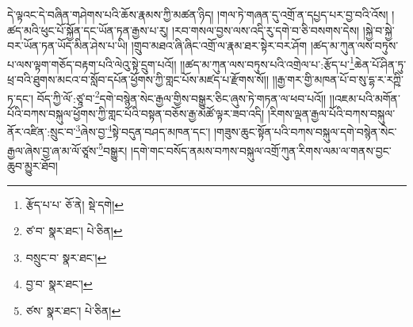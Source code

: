 དེ་ལྟའང་དེ་བཞིན་གཤེགས་པའི་ཆོས་རྣམས་ཀྱི་མཚན་ཉིད། །གལ་ཏེ་གཞན་དུ་འགྲོ་ན་དཔྱད་པར་བྱ་བའི་འོས། །ཚད་མའི་ཕུང་པོ་སྐྱོན་དང་ཡོན་ཏན་རྒྱས་པ་རུ། །རབ་གསལ་བྱས་ལས་འདི་རུ་དགེ་བ་ཅི་བསགས་དེས། །སྐྱེ་བ་སྐྱེ་བར་ཡོན་ཏན་ཡོད་མིན་ཤེས་པ་ཡི། །གྲུབ་མཐའ་ཞི་ཞིང་འགྲོ་ལ་རྣམ་ཐར་སྟེར་བར་ཤོག །ཚད་མ་ཀུན་ལས་བཏུས་པ་ལས་ལྟག་གཅོད་བརྟག་པའི་ལེའུ་སྟེ་དྲུག་པའོ།། །།ཚད་མ་ཀུན་ལས་བཏུས་པའི་འགྲེལ་པ་:རྩོད་པ་\footnote{རྩོད་པ་པ་  ཅོ་ནེ།  སྡེ་དགེ། }ཆེན་པོ་ཤིན་ཏུ་ཕྲ་བའི་ཐུགས་མངའ་བ་སློབ་དཔོན་ཕྱོགས་ཀྱི་གླང་པོས་མཛད་པ་རྫོགས་སོ།། །།རྒྱ་གར་གྱི་མཁན་པོ་བ་སུ་དྷ་ར་རཀྵི་ཏ་དང་། བོད་ཀྱི་ལོ་:ཙཱ་བ་\footnote{ཙ་བ་  སྣར་ཐང་།  པེ་ཅིན། }དགེ་བསྙེན་སེང་རྒྱལ་གྱིས་བསྒྱུར་ཅིང་ཞུས་ཏེ་གཏན་ལ་ཕབ་པའོ།། །།འཇམ་པའི་མགོན་པོའི་བཀས་བསྐུལ་ཕྱོགས་ཀྱི་གླང་པོའི་བསྟན་བཅོས་རྒྱ་མཚོ་ལྟར་ཟབ་འདི། །རིགས་ལྡན་རྒྱལ་པོའི་བཀས་བསྐུལ་ནོར་འཛིན་:སྲུང་བ་\footnote{བསྲུང་བ་  སྣར་ཐང་། }ཞེས་བྱ་\footnote{བྱ་བ་  སྣར་ཐང་། }སྟེ་བདུན་བཤད་མཁན་དང་། །གཟུས་ཆུང་སྟོན་པའི་བཀས་བསྐུལ་དགེ་བསྙེན་སེང་རྒྱལ་ཞེས་བྱ་ཞ་མ་ལོ་ཙཱས་\footnote{ཙས་  སྣར་ཐང་།  པེ་ཅིན། }བསྒྱུར། །དགེ་གང་བསོད་ནམས་བཀས་བསྐུལ་འགྲོ་ཀུན་རིགས་ལམ་ལ་གནས་བྱང་ཆུབ་མྱུར་ཐོབ།